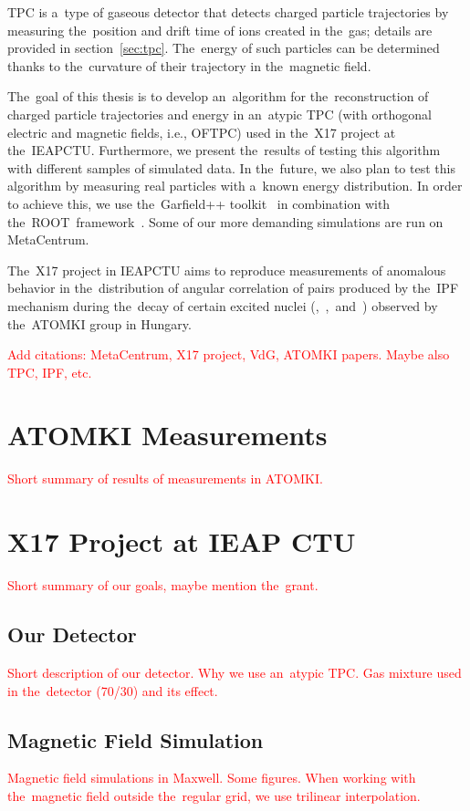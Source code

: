 	\ac{TPC} is a~type of gaseous detector that detects charged particle trajectories by measuring the~position and drift time of ions created in the~gas; details are provided in section~\ref{sec:tpc}. The~energy of such particles can be determined thanks to the~curvature of their trajectory in the~magnetic field.
	
	The~goal of this thesis is to develop an~algorithm for the~reconstruction of charged particle trajectories and energy in an~atypic \ac{TPC} (with orthogonal electric and magnetic fields, i.e., \ac{OFTPC}) used in the~X17 project at the~\ac{IEAPCTU}. Furthermore, we present the~results of testing this algorithm with different samples of simulated data. In the~future, we also plan to test this algorithm by measuring real particles with a~known energy distribution. In order to achieve this, we use the~Garfield++ toolkit~\cite{Garfield++} in combination with the~ROOT~framework~\cite{ROOT}. Some of our more demanding simulations are run on MetaCentrum.
	
	The~X17 project in \ac{IEAPCTU} aims to reproduce measurements of anomalous behavior in the~distribution of angular correlation of pairs produced by the~\ac{IPF} mechanism during the~decay of certain excited nuclei (,~,~and~) observed by the~ATOMKI group in Hungary. 
	
	\textcolor{red}{Add citations: MetaCentrum, X17 project, VdG, ATOMKI papers. Maybe also TPC, IPF, etc.}
	
	\section{ATOMKI Measurements}
	\textcolor{red}{Short summary of results of measurements in ATOMKI.}
	
	\section{X17 Project at IEAP CTU}
	\label{sec:IEAP}
		\textcolor{red}{Short summary of our goals, maybe mention the~grant.}
	
		\subsection{Our Detector}
		\textcolor{red}{Short description of our detector. Why we use an~atypic TPC. Gas mixture used in the~detector (70/30) and its effect.}
		
		\subsection{Magnetic Field Simulation}
		\textcolor{red}{Magnetic field simulations in Maxwell. Some figures. When working with the~magnetic field outside the~regular grid, we use trilinear interpolation.}
		
